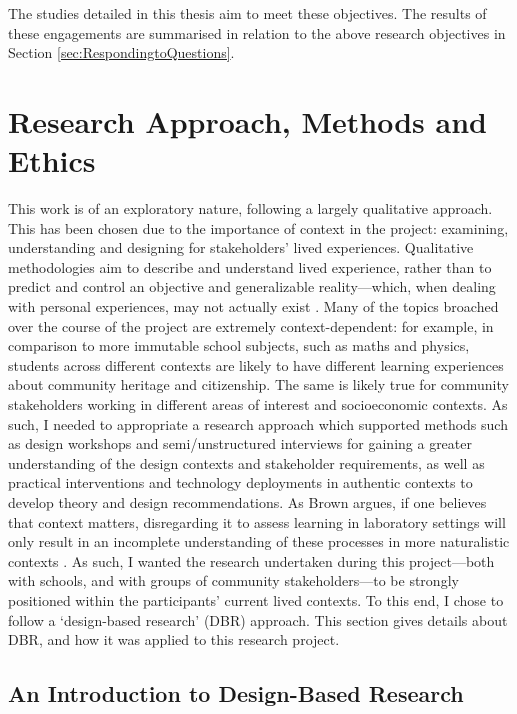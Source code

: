 The studies detailed in this thesis aim to meet these objectives. The results of these engagements are summarised in relation to the above research objectives in Section \ref{sec:RespondingtoQuestions}.

\section{Research Approach, Methods and Ethics}
\label{sec:ResearchApproach}

This work is of an exploratory nature, following a largely qualitative approach. This has been chosen due to the importance of context in the project: examining, understanding and designing for stakeholders' lived experiences. Qualitative methodologies aim to describe and understand lived experience, rather than to predict and control an objective and generalizable reality---which, when dealing with personal experiences, may not actually exist \citep{macdonald2012}. Many of the topics broached over the course of the project are extremely context-dependent: for example, in comparison to more immutable school subjects, such as maths and physics, students across different contexts are likely to have different learning experiences about community heritage and citizenship. The same is likely true for community stakeholders working in different areas of interest and socioeconomic contexts. As such, I needed to appropriate a research approach which supported methods such as design workshops and semi/unstructured interviews for gaining a greater understanding of the design contexts and stakeholder requirements, as well as practical interventions and technology deployments in authentic contexts to develop theory and design recommendations. As Brown argues, if one believes that context matters, disregarding it to assess learning in laboratory settings will only result in an incomplete understanding of these processes in more naturalistic contexts \citep{brown1992}. As such, I wanted the research undertaken during this project---both with schools, and with groups of community stakeholders---to be strongly positioned within the participants' current lived contexts. To this end, I chose to follow a `design-based research' (DBR) approach. This section gives details about DBR, and how it was applied to this research project.

\subsection{An Introduction to Design-Based Research}

